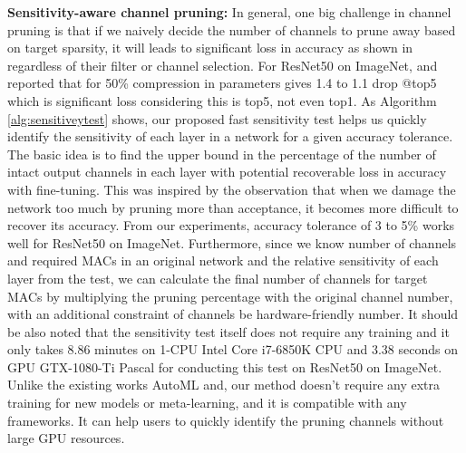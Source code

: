 \documentclass{article}
\begin{document}
\textbf{Sensitivity-aware channel pruning:} %
In general, one big challenge in channel pruning is that if we naively decide the number of channels to prune away based on target sparsity, it will leads to significant loss in accuracy as shown in  \cite{Li2016PruningFF}\cite{Molchanov2016PruningCN}\cite{luo2017thinet}\cite{He_2017_ICCV}\cite{Liu2017learning} regardless of their filter or channel selection. For ResNet50 on ImageNet, \cite{He_2017_ICCV} and \cite{luo2017thinet} reported that for 50\% compression in parameters gives 1.4 to 1.1 drop @top5 which is significant loss considering this is top5, not even top1. 
As Algorithm \ref{alg:sensitiveytest} shows, our proposed fast sensitivity test helps us quickly identify the sensitivity of each layer in a network for a given accuracy tolerance. The basic idea is to find the upper bound in the percentage of the number of intact output channels in each layer with potential recoverable loss in accuracy with fine-tuning. This was inspired by the observation that when we damage the network too much by pruning more than acceptance, it becomes more difficult to recover its accuracy. From our experiments, accuracy tolerance of 3 to 5\% works well for ResNet50 on ImageNet. %
Furthermore, since we know number of channels and required MACs in an original network and the relative sensitivity of each layer from the test, we can calculate the final number of channels for target MACs by multiplying the pruning percentage with the original channel number, with an additional constraint of channels be hardware-friendly number.
It should be also noted that the sensitivity test itself does not require any training and it only takes 8.86 minutes on 1-CPU Intel Core i7-6850K CPU and 3.38 seconds on GPU GTX-1080-Ti Pascal for conducting this test on ResNet50 on ImageNet. Unlike the existing works AutoML\cite{he2018amc} and\cite{chin2018layer}, our method doesn't require any extra training for new models or meta-learning, and it is compatible with any frameworks. It can help users to quickly identify the pruning channels without large GPU resources.
\end{document}
